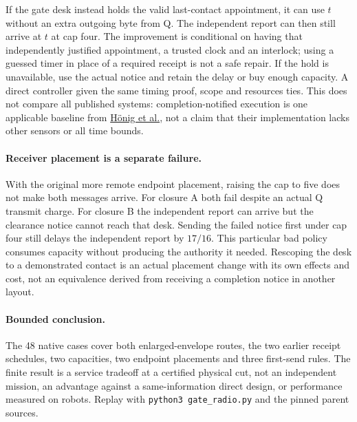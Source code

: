 \documentclass{article}
\begin{document}
If the gate desk instead holds the valid last-contact appointment,
it can use \(t\) without an extra outgoing byte from Q. The
independent report can then still arrive at \(t\) at cap four.
The improvement is conditional on having that independently
justified appointment, a trusted clock and an interlock; using
a guessed timer in place of a required receipt is not a safe
repair. If the hold is unavailable, use the actual notice and
retain the delay or buy enough capacity. A direct controller
given the same timing proof, scope and resources ties. This
does not compare all published systems: completion-notified
execution is one applicable baseline from
\href{https://whoenig.github.io/publications/2019_RA-L_Hoenig.pdf}{H\"onig et al.},
not a claim that their implementation lacks other sensors or
all time bounds.

\paragraph{Receiver placement is a separate failure.}
With the original more remote endpoint placement, raising
the cap to five does not make both messages arrive.
For closure A both fail despite an actual Q transmit charge.
For closure B the independent report can arrive but the
clearance notice cannot reach that desk. Sending the failed
notice first under cap four still delays the independent report
by \(17/16\). This particular bad policy consumes capacity
without producing the authority it needed. Rescoping the
desk to a demonstrated contact is an actual placement
change with its own effects and cost, not an equivalence
derived from receiving a completion notice in another layout.

\paragraph{Bounded conclusion.}
The 48 native cases cover both enlarged-envelope routes,
the two earlier receipt schedules, two capacities, two endpoint
placements and three first-send rules. The finite result is a
service tradeoff at a certified physical cut, not an independent
mission, an advantage against a same-information direct design,
or performance measured on robots. Replay with
\texttt{python3 gate\_radio.py} and the pinned parent sources.
\end{document}
